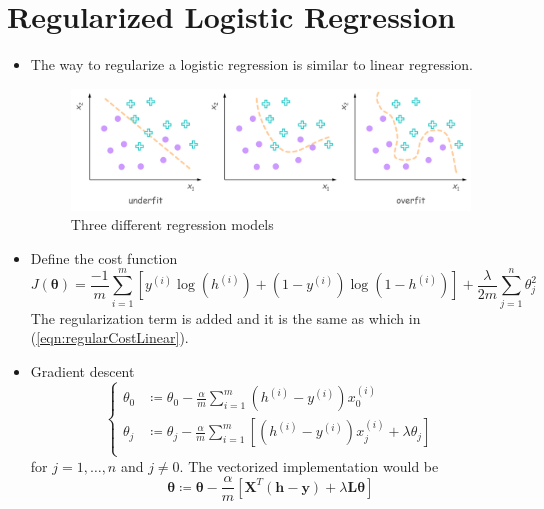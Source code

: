 \section{Regularized Logistic Regression}
\begin{itemize}
    \item The way to regularize a logistic regression is similar to linear regression.
    \begin{figure}[H]\label{fig:logisticFit}
        \centering
        \includegraphics[width=5.4in]{./images/logisticFit.png}
        \caption{Three different regression models}
    \end{figure}
    
    \item Define the cost function
    \begin{equation}
        J(\mathbf{\theta}) = \frac{-1}{m}\sum_{i=1}^{m}{\left[y^{(i)} \log{(h^{(i)})} + (1-y^{(i)}) \log{(1-h^{(i)})} \right]} + \frac{\lambda}{2m}\sum_{j=1}^{n}{\theta_j^2}
    \end{equation}
    The regularization term is added and it is the same as which in (\ref{eqn:regularCostLinear}).
    
    \item Gradient descent
    \begin{equation}
        \left\{
        \begin{aligned}
            \theta_0 &\coloneqq \theta_0 - \frac{\alpha}{m} \sum_{i=1}^{m} {\left(h^{(i)} - y^{(i)}\right)x_0^{(i)}}\\
            \theta_j &\coloneqq \theta_j - \frac{\alpha}{m} \sum_{i=1}^{m} \left[ {\left( h^{(i)} - y^{(i)}\right)x_j^{(i)} + \lambda\theta_j} \right]\\
        \end{aligned}
        \right.    
    \end{equation}
    for $j = 1, \dots, n$ and $j \neq 0$. The vectorized implementation would be
    \begin{equation}
        \mathbf{\theta} \coloneqq \mathbf{\theta} - \frac{\alpha}{m} \left[ \mathbf{X}^T \left(\mathbf{h} - \mathbf{y}\right) + \lambda\mathbf{L}\mathbf{\theta} \right]
    \end{equation}
\end{itemize}
    